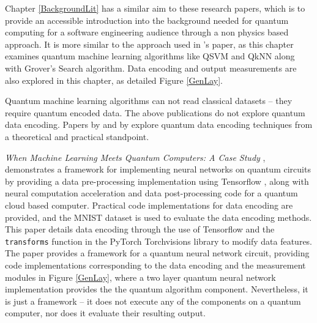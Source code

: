 Chapter \ref{BackgroundLit} has a similar aim to these research papers, which is to provide an accessible introduction into the background needed for quantum computing for a software engineering audience through a non physics based approach. It is more similar to the approach used in
\citeauthor{research1}'s
paper, as this chapter examines quantum machine learning algorithms like QSVM and QkNN along with Grover’s Search algorithm. %
Data encoding and output measurements are also explored in this chapter, as detailed Figure \ref{GenLay}.

Quantum machine learning algorithms can not read classical datasets -- they require quantum encoded data. The above publications do not explore quantum data encoding. Papers by \citeauthor{softIntro}
and by \citeauthor{Khan2019} %
explore quantum data encoding techniques from a theoretical and practical standpoint.


\emph{When Machine Learning Meets Quantum Computers: A Case Study} \citep{softIntro}, demonstrates a framework for implementing neural networks on quantum circuits by providing a data pre-processing implementation using Tensorflow \citep{tensorflow}, along with neural computation acceleration and data post-processing code for a quantum cloud based computer. 
Practical code implementations for data encoding are provided, and the MNIST dataset \citep{deng2012mnist} is used to evaluate the data encoding methods. This paper details data encoding through the use of Tensorflow and the \texttt{transforms} function in the PyTorch \citep{paszke2017automatic} Torchvisions \citep{torchvision}  library to modify data features. The paper provides a framework for a quantum neural network circuit, providing code implementations corresponding to the data encoding and the measurement modules in Figure \ref{GenLay}, where a two layer quantum neural network implementation provides the the quantum algorithm component. Nevertheless, it is just a framework -- it does not execute any of the components on a quantum computer, nor does it evaluate their resulting output.

